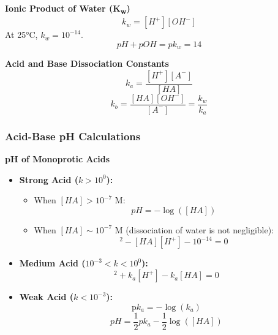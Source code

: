 \textbf{Ionic Product of Water (K\textsubscript{w})}
\begin{equation}
k_w = [H^+][OH^-]
\end{equation}
At 25°C, \( k_w = 10^{-14} \).
\begin{equation}
pH + pOH = pk_w = 14
\end{equation}

\textbf{Acid and Base Dissociation Constants}
\begin{equation}
k_a = \frac{[H^+][A^-]}{[HA]}
\end{equation}
\begin{equation}
k_b = \frac{[HA][OH^-]}{[A^-]} = \frac{k_w}{k_a}
\end{equation}

\subsubsection*{Acid-Base pH Calculations}

\textbf{pH of Monoprotic Acids}
\begin{itemize}
    \item \textbf{Strong Acid ($k > 10^0$):}
    \begin{itemize}
        \item When \( [HA] > 10^{-7} \) M:
        \begin{equation}
        pH = -\log([HA])
        \end{equation}
        \item When \([HA] \sim 10^{-7} \) M (dissociation of water is not negligible):
        \begin{equation}
        [H^+]^2 - [HA][H^+] - 10^{-14} = 0
        \end{equation}
    \end{itemize}
    \item \textbf{Medium Acid ($10^{-3} < k < 10^0$):}
    \begin{equation}
    [H^+]^2 + k_a[H^+] - k_a[HA] = 0
    \end{equation}
    \item \textbf{Weak Acid ($k < 10^{-3}$):}
    \begin{equation}
    \text{p}k_a = -\log(k_a)
    \end{equation}
    \begin{equation}
    pH = \frac{1}{2} pk_a - \frac{1}{2} \log([HA])
    \end{equation}
\end{itemize}

